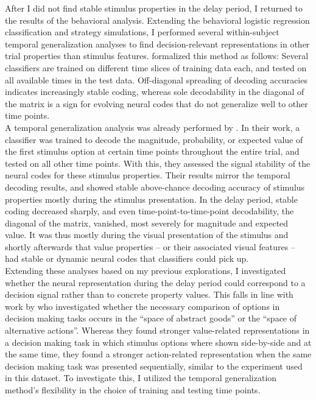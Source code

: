 After I did not find stable stimulus properties in the delay period, I returned to the results of the behavioral analysis. Extending the behavioral logistic regression classification and strategy simulations, I performed several within-subject temporal generalization analyses to find decision-relevant representations in other trial properties than stimulus features.
\citet{king2014characterizing} formalized this method as follows:
Several classifiers are trained on different time slices of training data each, and tested on all available times in the test data.
Off-diagonal spreading of decoding accuracies indicates increasingly stable coding, whereas sole decodability in the diagonal of the matrix is a sign for evolving neural codes that do not generalize well to other time points.\\
A temporal generalization analysis was already performed by \citet{kaiserposter}.
In their work, a classifier was trained to decode the magnitude, probability, or expected value of the first stimulus option at certain time points throughout the entire trial, and tested on all other time points.
With this, they assessed the signal stability of the neural codes for these stimulus properties.
Their results mirror the temporal decoding results, and showed stable above-chance decoding accuracy of stimulus properties mostly during the stimulus presentation.
In the delay period, stable coding decreased sharply, and even time-point-to-time-point decodability, the diagonal of the matrix, vanished, most severely for magnitude and expected value.
It was thus mostly during the visual presentation of the stimulus and shortly afterwards that value properties -- or their associated visual features -- had stable or dynamic neural codes that classifiers could pick up.\\
Extending these analyses based on my previous explorations, I investigated whether the neural representation during the delay period could correspond to a decision signal rather than to concrete property values.
This falls in line with work by \citet{hunt2013trial} who investigated whether the necessary comparison of options in decision making tasks occurs in the ``space of abstract goods'' or the ``space of alternative actions''.
Whereas they found stronger value-related representations in a decision making task in which stimulus options where shown side-by-side and at the same time, they found a stronger action-related representation when the same decision making task was presented sequentially, similar to the experiment used in this dataset.
To investigate this, I utilized the temporal generalization method's flexibility in the choice of training and testing time points.
